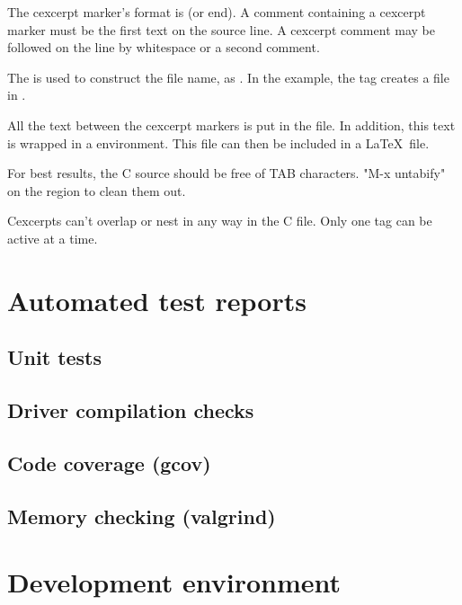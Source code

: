 The cexcerpt marker's format is  (or
end). A comment containing a cexcerpt marker must be the first text on
the source line. A cexcerpt comment may be followed on the line by
whitespace or a second comment.

The  is used to construct the file name, as
.  In the example, the tag  creates
a file  in .

All the text between the cexcerpt markers is put in the file.  In
addition, this text is wrapped in a  environment.  This
file can then be included in a \LaTeX\ file.

For best results, the C source should be free of TAB characters.
"M-x untabify" on the region to clean them out.

Cexcerpts can't overlap or nest in any way in the C file. Only one tag
can be active at a time.

\section{Automated test reports}

  \subsection{Unit tests}

  \subsection{Driver compilation checks}

  \subsection{Code coverage (gcov)}

  \subsection{Memory checking (valgrind)}



\section{Development environment}

